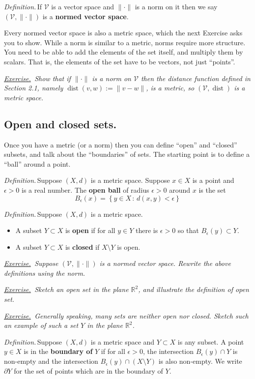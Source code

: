 \documentclass[12pt]{article}
\newcommand{\cV}{\mathcal{V}}
\newcommand{\RR}{\mathbb{R}}
\newcommand{\eps}{\epsilon}
\newcommand{\sect}[1]{\subsection*{#1.}}
\newcommand{\defin}{\emph{Definition.}\,}
\newcommand{\exer}[2]{\emph{\underline{Exercise.}\, #2} \vspace*{#1mm}}
\begin{document}
\defin If $\cV$ is a vector space and $\|\cdot\|$ is a norm on it then we say $(\cV,\|\cdot\|)$ is a \textbf{normed vector space}.

Every normed vector space is also a metric space, which the next Exercise asks you to show.  While a norm is similar to a metric, norms require more structure.  You need to be able to add the elements of the set itself, and multiply them by scalars.  That is, the elements of the set have to be vectors, not just ``points''.

\exer{50}{Show that if $\|\cdot\|$ is a norm on $\cV$ then the distance function defined in Section 2.1, namely $\operatorname{dist}(v,w) := \|v-w\|$, is a metric, so $(\cV,\operatorname{dist})$ is a metric space.}


\sect{Open and closed sets}

Once you have a metric (or a norm) then you can define ``open'' and ``closed'' subsets, and talk about the ``boundaries'' of sets.  The starting point is to define a ``ball'' around a point.

\defin Suppose $(X,d)$ is a metric space.  Suppose $x\in X$ is a point and $\eps>0$ is a real number.  The \textbf{open ball} of radius $\eps>0$ around $x$ is the set
	$$B_\eps(x) = \left\{y\in X\,:\,d(x,y) < \eps\right\}$$ 

\defin Suppose $(X,d)$ is a metric space.
\begin{itemize}
\item A subset $Y\subset X$ is \textbf{open} if for all $y\in Y$ there is $\eps>0$ so that $B_\eps(y) \subset Y$.
\item A subset $Y\subset X$ is \textbf{closed} if $X \setminus Y$ is open.
\end{itemize}

\exer{60}{Suppose $(\cV,\|\cdot\|)$ is a normed vector space.  Rewrite the above definitions using the norm.}

\exer{60}{Sketch an open set in the plane $\RR^2$, and illustrate the definition of open set.}

\clearpage\newpage
\exer{60}{Generally speaking, many sets are neither open nor closed.  Sketch such an example of such a set $Y$ in the plane $\RR^2$.}

\defin Suppose $(X,d)$ is a metric space and $Y \subset X$ is any subset.  A point $y\in X$ is in the \textbf{boundary of } $Y$ if for all $\eps>0$, the intersection $B_\eps(y)\cap Y$ is non-empty and the intersection $B_\eps(y)\cap (X\setminus Y)$ is also non-empty.  We write $\partial Y$ for the set of points which are in the boundary of $Y$.
\end{document}
